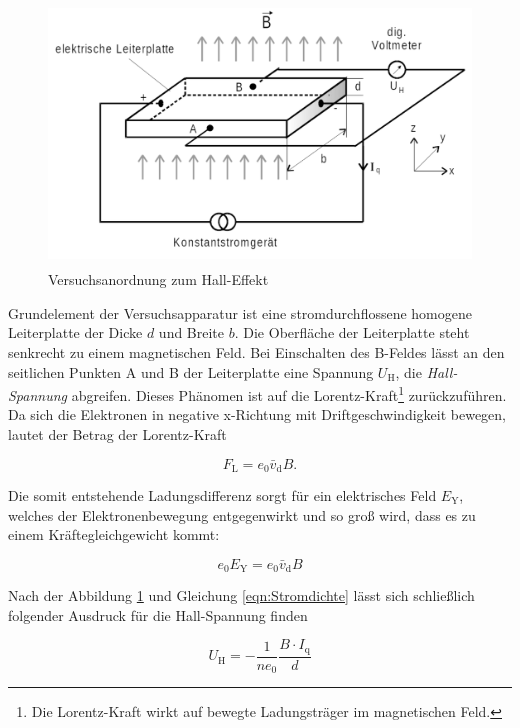 \begin{figure}[H]
    \centering 
    \includegraphics[height=7cm]{Hall-Effekt.png}
    \caption{Versuchsanordnung zum Hall-Effekt \cite{Versuchsanleitung_v511}}
    \label{fig:Hall-Effekt}
\end{figure}

\noindent Grundelement der Versuchsapparatur ist eine stromdurchflossene homogene Leiterplatte der Dicke $d$ und Breite $b$.
Die Oberfläche der Leiterplatte steht senkrecht zu einem magnetischen Feld. Bei Einschalten des B-Feldes lässt an den 
seitlichen Punkten A und B der Leiterplatte eine Spannung $U_\text{H}$, die \emph{Hall-Spannung} abgreifen.
Dieses Phänomen ist auf die Lorentz-Kraft\footnote{Die Lorentz-Kraft wirkt auf bewegte Ladungsträger im magnetischen Feld.}
zurückzuführen. Da sich die Elektronen in negative x-Richtung mit Driftgeschwindigkeit bewegen, lautet der 
Betrag der Lorentz-Kraft 

\begin{equation*}
    F_\text{L} = e_{0}\bar{v}_\text{d}B. 
\end{equation*}

\noindent Die somit entstehende Ladungsdifferenz sorgt für ein elektrisches Feld $E_\text{Y}$, welches der 
Elektronenbewegung entgegenwirkt und so groß wird, dass es zu einem Kräftegleichgewicht kommt:

\begin{equation*}
    e_{0}E_\text{Y} = e_{0}\bar{v}_\text{d}B 
\end{equation*}

\noindent Nach der Abbildung \ref{fig:Hall-Effekt} und Gleichung \eqref{eqn:Stromdichte} lässt sich schließlich
folgender Ausdruck für die Hall-Spannung finden 

\begin{equation*}
    U_\text{H} = -\frac{1}{ne_0}\frac{B\cdot{}I_\text{q}}{d}
\end{equation*}

